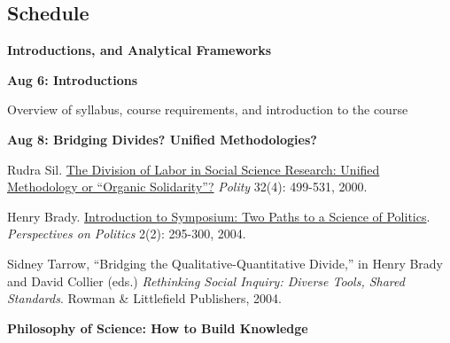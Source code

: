\documentclass[letterpaper]{article}
\renewenvironment{itemize}{
  \begin{list}{}{
    \setlength{\leftmargin}{1.5em}
  }
}{
  \end{list}
}
\begin{document}
\subsection*{Schedule}

\begin{enumerate}

\item {\bf Introductions, and Analytical Frameworks}
	\begin{itemize}
		\item {\bf Aug 6: Introductions}
			\begin{itemize}
				\item[$\bullet$] Overview of syllabus, course requirements, and introduction to the course
			\end{itemize}

		\item {\bf Aug 8: Bridging Divides? Unified Methodologies?}
		\begin{itemize}
			\item[$\bullet$] Rudra Sil. \href{https://www.journals.uchicago.edu/doi/abs/10.2307/3235291}{The Division of Labor in Social Science Research: Unified Methodology or ``Organic Solidarity''?} \emph{Polity} 32(4): 499-531, 2000.
			\item[$\bullet$] Henry Brady. \href{http://www.jstor.org/stable/3688441}{Introduction to Symposium: Two Paths to a Science of Politics}. \emph{Perspectives on Politics} 2(2): 295-300, 2004.
			\item[$\bullet$] Sidney Tarrow, ``Bridging the Qualitative-Quantitative Divide,'' in  Henry Brady and David Collier (eds.) \emph{Rethinking Social Inquiry: Diverse Tools, Shared Standards}. Rowman \& Littlefield Publishers, 2004.
		\end{itemize}
	\end{itemize}

\item {\bf Philosophy of Science: How to Build Knowledge}



\end{enumerate}
\end{document}
